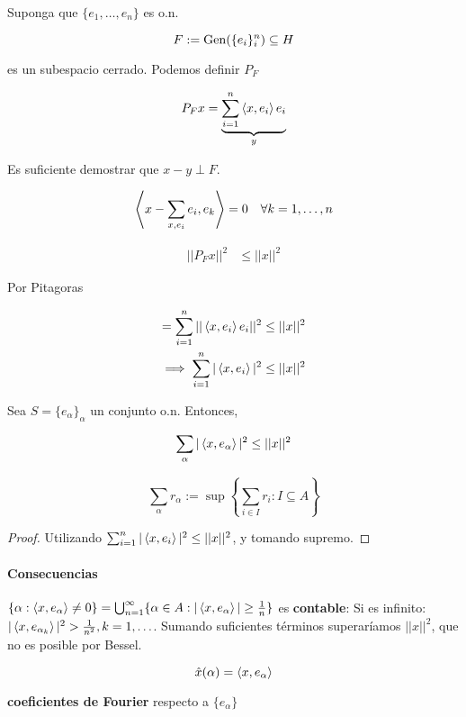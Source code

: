Suponga que $\{e_1,\ldots,e_n\}$ es o.n.

\[F:=\operatorname{Gen}(\{e_i\}_i^n)\subseteq H\]

es un subespacio cerrado. Podemos definir $P_F$

\[P_F x=\underbrace{\sum_{i=1}^n \left\langle x,e_i\right\rangle e_i}_{y}\]

Es suficiente demostrar que $x-y\perp F$.

\begin{align*}
    \left\langle x-\sum_{x,e_i}e_i,e_k\right\rangle=0\quad \forall k= 1,\ldots,n
\end{align*}

\begin{align*}
    ||P_F x||^2&\leq ||x||^2
\end{align*}

Por Pitagoras

\begin{align*}
    =\sum_{i=1}^n ||\left\langle x,e_i\right\rangle e_i||^2\leq ||x||^2\\
    \implies \sum_{i=1}^n |\left\langle x,e_i\right\rangle|^2\leq ||x||^2
\end{align*}

\begin{fproposition}
    Sea $S=\{e_\alpha\}_\alpha$ un conjunto o.n. Entonces,

    \[\sum_{\alpha} |\left\langle x,e_\alpha\right\rangle|^2\leq ||x||^2 \]
\end{fproposition}

\[\sum_\alpha r_\alpha:=\sup\left\{\sum_{i\in I}r_i:I\subseteq A\right\}\]

\begin{proof}
    Utilizando $\sum_{i=1}^n |\left\langle x,e_i\right\rangle|^2\leq ||x||^2$, y tomando supremo.
\end{proof}

\paragraph{Consecuencias} $\{\alpha:\left\langle x,e_\alpha\right\rangle\neq 0\}=\bigcup_{n=1}^\infty \{\alpha \in A:|\left\langle x,e_\alpha\right\rangle|\geq \frac{1}{n}\}$ es \textbf{contable}: Si es infinito: $|\left\langle x,e_{\alpha_k}\right\rangle|^2>\frac{1}{n^2}, k=1,\ldots$. Sumando suficientes términos superaríamos $||x||^2$, que no es posible por Bessel.

\begin{fdefinition}
    \[\hat x(\alpha)=\left\langle x,e_\alpha\right\rangle\]

    \textbf{coeficientes de Fourier} respecto a $\{e_\alpha\}$
\end{fdefinition}

